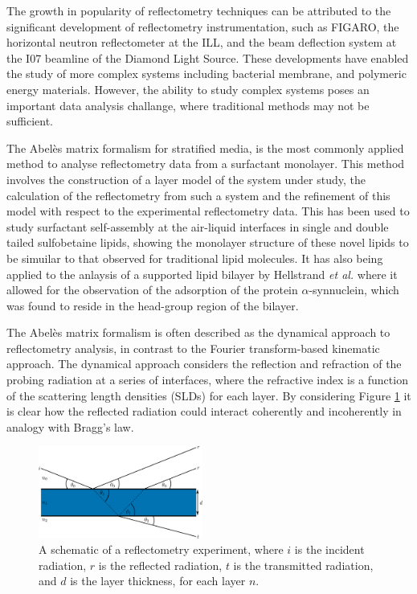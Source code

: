 \documentclass[twoside,twocolumn,9pt]{article}
\begin{document}
The growth in popularity of reflectometry techniques can be attributed to the significant development of reflectometry instrumentation, such as FIGARO, the horizontal neutron reflectometer at the ILL,\cite{Campbell2011} and the beam deflection system at the I07 beamline of the Diamond Light Source.\cite{Arnold2012}
These developments have enabled the study of more complex systems including bacterial membrane,\cite{Barker2016} and polymeric energy materials.\cite{Khodakarimi2016}
However, the ability to study complex systems poses an important data analysis challange, where traditional methods may not be sufficient.

The Abel\`{e}s matrix formalism for stratified media, \cite{Abeles1950} is the most commonly applied method to analyse reflectometry data from a surfactant monolayer.
This method involves the construction of a layer model of the system under study, the calculation of the reflectometry from such a system and the refinement of this model with respect to the experimental reflectometry data.
This has been used to study surfactant self-assembly at the air-liquid interfaces in single and double tailed sulfobetaine lipids,\cite{Hazell2016} showing the monolayer structure of these novel lipids to be simuilar to that observed for traditional lipid molecules.
It has also being applied to the anlaysis of a supported lipid bilayer by Hellstrand \emph{et al.}\cite{Hellstrand2013} where it allowed for the observation of the adsorption of the protein $\alpha$-synnuclein, which was found to reside in the head-group region of the bilayer.

The Abel\`{e}s matrix formalism is often described as the dynamical approach to reflectometry analysis, in contrast to the Fourier transform-based kinematic approach.\cite{Crowley1991,Lu1996}
The dynamical approach considers the reflection and refraction of the probing radiation at a series of interfaces, where the refractive index is a function of the scattering length densities (SLDs) for each layer.
By considering Figure \ref{fig:dyn} it is clear how the reflected radiation could interact coherently and incoherently in analogy with Bragg's law.
%
\begin{figure}[h]
\centering
  \includegraphics[width=0.48\textwidth]{figures/reflrefr}
  \caption{A schematic of a reflectometry experiment, where $i$ is the incident radiation, $r$ is the reflected radiation, $t$ is the transmitted radiation, and $d$ is the layer thickness, for each layer $n$.}
  \label{fig:dyn}
\end{figure}
%
\end{document}
